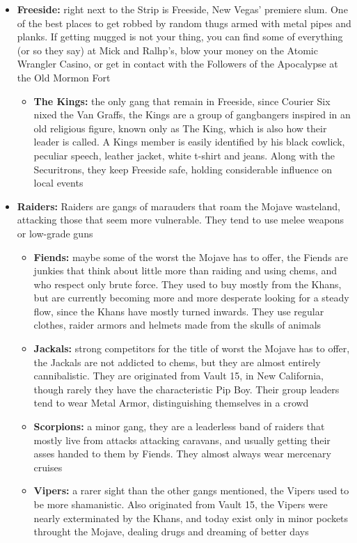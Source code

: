 \documentclass[11pt]{article} %
\begin{document}
\begin{itemize}
\item \textbf{Freeside:} right next to the Strip is Freeside, New Vegas' premiere slum. One of the best places to get robbed by random thugs armed with metal pipes and planks. If getting mugged is not your thing, you can find some of everything (or so they say) at Mick and Ralhp's, blow your money on the Atomic Wrangler Casino, or get in contact with the Followers of the Apocalypse at the Old Mormon Fort
	\begin{itemize}
	\item \textbf{The Kings:} the only gang that remain in Freeside, since Courier Six nixed the Van Graffs, the Kings are a group of gangbangers inspired in an old religious figure, known only as The King, which is also how their leader is called. A Kings member is easily identified by his black cowlick, peculiar speech, leather jacket, white t-shirt and jeans. Along with the Securitrons, they keep Freeside safe, holding considerable influence on local events
	\end{itemize}

\item \textbf{Raiders:} Raiders are gangs of marauders that roam the Mojave wasteland, attacking those that seem more vulnerable. They tend to use melee weapons or low-grade guns
	\begin{itemize}
	\item \textbf{Fiends:} maybe some of the worst the Mojave has to offer, the Fiends are junkies that think about little more than raiding and using chems, and who respect only brute force. They used to buy mostly from the Khans, but are currently becoming more and more desperate looking for a steady flow, since the Khans have mostly turned inwards. They use regular clothes, raider armors and helmets made from the skulls of animals
	\item \textbf{Jackals:} strong competitors for the title of worst the Mojave has to offer, the Jackals are not addicted to chems, but they are almost entirely cannibalistic. They are originated from Vault 15, in New California, though rarely they have the characteristic Pip Boy. Their group leaders tend to wear Metal Armor, distinguishing themselves in a crowd
	\item \textbf{Scorpions:} a minor gang, they are a leaderless band of raiders that mostly live from attacks attacking caravans, and usually getting their asses handed to them by Fiends. They almost always wear mercenary cruises
	\item \textbf{Vipers:} a rarer sight than the other gangs mentioned, the Vipers used to be more shamanistic. Also originated from Vault 15, the Vipers were nearly exterminated by the Khans, and today exist only in minor pockets throught the Mojave, dealing drugs and dreaming of better days
	\end{itemize}


\end{itemize}
\end{document}
